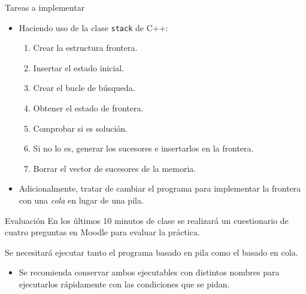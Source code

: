 \documentclass[usenames,dvipsnames,aspectratio=169]{beamer}
\begin{document}
\begin{frame}{Tareas a implementar}
	\begin{itemize}
		\item Haciendo uso de la clase \texttt{stack} de C++:
		\begin{enumerate}
			\item Crear la estructura frontera.
			\item Insertar el estado inicial.
			\item Crear el bucle de búsqueda.
			\item Obtener el estado de frontera.
			\item Comprobar si es solución.
			\item Si no lo es, generar los sucesores e insertarlos en la frontera.
			\item Borrar el vector de sucesores de la memoria.
		\end{enumerate}
		\item Adicionalmente, tratar de cambiar el programa para implementar la frontera con una \textit{cola} en lugar de una pila.
	\end{itemize}
\end{frame}

\begin{frame}{Evaluación}
	En los últimos 10 minutos de clase se realizará un cuestionario de cuatro preguntas en Moodle para evaluar la práctica.
	
	Se necesitará ejecutar tanto el programa basado en pila como el basado en cola.
	\begin{itemize}
		\item Se recomienda conservar ambos ejecutables con distintos nombres para ejecutarlos rápidamente con las condiciones que se pidan.
	\end{itemize}
\end{frame}

\begin{frame}
\titlepage
\end{frame}
\end{document}
